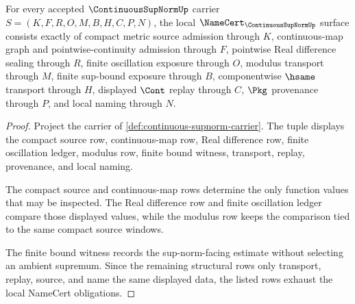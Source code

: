 \begin{theorem}
\label{thm:continuous-sup-norm-namecert-obligations}
For every accepted $\ContinuousSupNormUp$ carrier $S=(K,F,R,O,M,B,H,C,P,N)$, the local $\NameCert_{\ContinuousSupNormUp}$ surface consists exactly of compact metric source admission through $K$, continuous-map graph and pointwise-continuity admission through $F$, pointwise Real difference sealing through $R$, finite oscillation exposure through $O$, modulus transport through $M$, finite sup-bound exposure through $B$, componentwise $\hsame$ transport through $H$, displayed $\Cont$ replay through $C$, $\Pkg$ provenance through $P$, and local naming through $N$.
\end{theorem}
\begin{proof}
Project the carrier of \autoref{def:continuous-supnorm-carrier}. The tuple displays the compact source row, continuous-map row, Real difference row, finite oscillation ledger, modulus row, finite bound witness, transport, replay, provenance, and local naming.

The compact source and continuous-map rows determine the only function values that may be inspected. The Real difference row and finite oscillation ledger compare those displayed values, while the modulus row keeps the comparison tied to the same compact source windows.

The finite bound witness records the sup-norm-facing estimate without selecting an ambient supremum. Since the remaining structural rows only transport, replay, source, and name the same displayed data, the listed rows exhaust the local NameCert obligations.
\end{proof}

